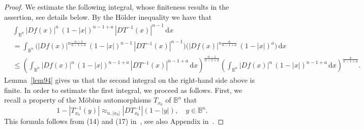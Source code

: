 \documentclass[11pt,a4paper,reqno]{amsart}
\theoremstyle{definition}
\newcommand{\B}{\mathbb{B}^n}
\newcommand{\ud}{\mathrm {d}}
\numberwithin{komcounter}{section}
\begin{document}
\begin{proof}
We estimate the following integral, whose finiteness results in the assertion, see details below. By the H\"older inequality we have that
\begin{align}
&\int_{\B} |Df(x)|^{n}\,(1-|x|)^{n-1+a}\,|DT^{-1}(x)|^{n-1}\,\ud x \label{eq3-lem75}\\
&= \int_{\B} \Big(|Df(x)|^{n\frac{n-1}{n-1+a}}\,(1-|x|)^{n-1}\,|DT^{-1}(x)|^{n-1}\Big)\Big(|Df(x)|^{n\frac{a}{n-1+a}}\,(1-|x|)^{a}\Big)\,\ud x \nonumber \\
&\leq \left(\int_{\B} |Df(x)|^{n}\,(1-|x|)^{n-1+a}\,|DT^{-1}(x)|^{n-1+a}\,\ud x\right)^{\frac{n-1}{n-1+a}}
\left(\int_{\B} |Df(x)|^{n}\,(1-|x|)^{n-1+a}\,\ud x\right)^{\frac{a}{n-1+a}}. \nonumber
\end{align}
Lemma~\ref{lem94} gives us that the second integral on the right-hand side above is finite.  In order to estimate the first  integral, we proceed as follows. First, we recall a property of the M\"obius automorphisms $T_{x_0}$ of $\B$ that
\[
 1-|T_{x_0}^{-1}(y)|\approx_{n, |x_0|} |DT_{x_0}^{-1}| (1-|y|),\quad y\in \B.  
\]
This formula follows from (14) and (17) in~\cite[Ch 2]{ahl}, see also Appendix in~\cite{ag2}.


\end{proof}
\end{document}
